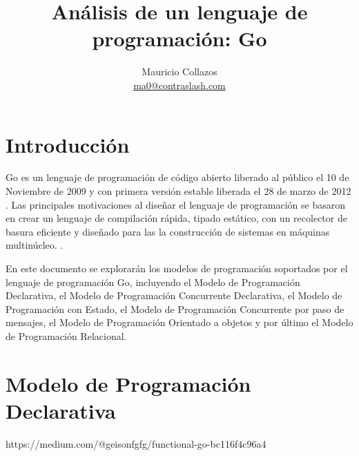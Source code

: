 \documentclass{article}
\author{Mauricio Collazos \\
\href{mailto:ma0@contraslash.com}{ma0@contraslash.com}}
\title{Análisis de un lenguaje de programación: Go}
\begin{document}
\maketitle
\section{Introducción}
Go es un lenguaje de programación de código abierto liberado al público el 10 de Noviembre de 2009 y con primera versión estable liberada el 28 de marzo de 2012 . Las principales motivaciones al diseñar el lenguaje de programación se basaron en crear un lenguaje de compilación rápida, tipado estático, con un recolector de basura eficiente y diseñado para las la construcción de sistemas en máquinas multinúcleo. \cite{FrequentlyLanguage}.

En este documento se explorarán los modelos de programación soportados por el lenguaje de programación Go, incluyendo el Modelo de Programación Declarativa, el Modelo de Programación Concurrente Declarativa, el Modelo de Programación con Estado, el Modelo de Programación Concurrente por paso de mensajes, el Modelo de Programación Orientado a objetos y por último el Modelo de Programación Relacional.

\section{Modelo de Programación Declarativa}
https://medium.com/@geisonfgfg/functional-go-bc116f4c96a4

 

\end{document}
